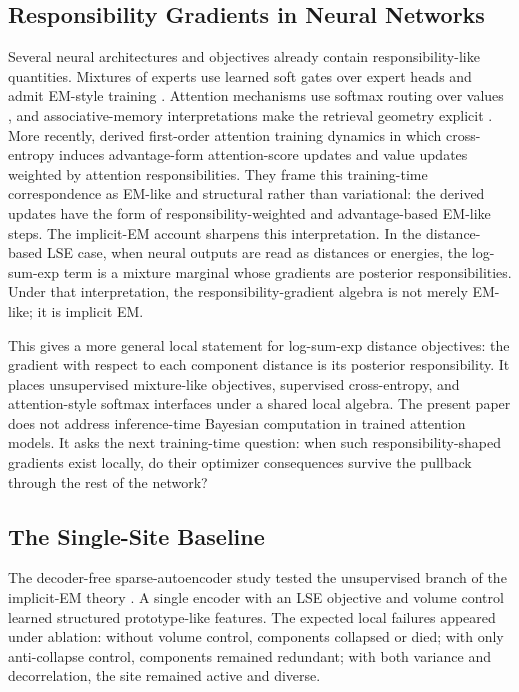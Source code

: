 \subsection{Responsibility Gradients in Neural Networks}
Several neural architectures and objectives already contain
responsibility-like quantities. Mixtures of experts use learned soft gates
over expert heads and admit EM-style training
\citep{jordan1994hierarchical}. Attention mechanisms use softmax routing over
values \citep{vaswani2017attention}, and associative-memory interpretations
make the retrieval geometry explicit \citep{ramsauer2021hopfield}. More
recently, \citet{agarwal2025gradient} derived first-order attention training
dynamics in which cross-entropy induces advantage-form attention-score
updates and value updates weighted by attention responsibilities. They frame
this training-time correspondence as EM-like and structural rather than variational:
the derived updates have the form of responsibility-weighted and
advantage-based EM-like steps. The implicit-EM account 
\citep{oursland2025implicitem} sharpens this interpretation. In the 
distance-based LSE case, when neural outputs are read as distances or 
energies, the log-sum-exp term is a mixture marginal whose gradients are 
posterior responsibilities. Under that interpretation, the 
responsibility-gradient algebra is not merely EM-like; it is implicit EM.

This gives a more general local statement for log-sum-exp distance
objectives: the gradient with respect to each component distance is its
posterior responsibility. It places unsupervised mixture-like objectives,
supervised cross-entropy, and attention-style softmax interfaces under a
shared local algebra. The present paper does not address inference-time
Bayesian computation in trained attention models. It asks the next
training-time question: when such responsibility-shaped gradients exist
locally, do their optimizer consequences survive the pullback through the rest
of the network?

\subsection{The Single-Site Baseline}
The decoder-free sparse-autoencoder study tested the unsupervised branch of
the implicit-EM theory \citep{oursland2026decoderfree}. A single encoder with
an LSE objective and volume control learned structured prototype-like
features. The expected local failures appeared under ablation: without volume
control, components collapsed or died; with only anti-collapse control,
components remained redundant; with both variance and decorrelation, the
site remained active and diverse.

